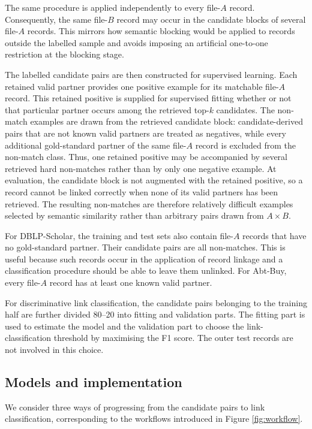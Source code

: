 The same procedure is applied independently to every file-$A$ record.
Consequently, the same file-$B$ record may occur in the candidate blocks
of several file-$A$ records. This mirrors how semantic blocking would be
applied to records outside the labelled sample and avoids imposing an
artificial one-to-one restriction at the blocking stage.

The labelled candidate pairs are then constructed for supervised learning. Each retained
valid partner provides one positive example for its matchable file-$A$ record. This retained
positive is supplied for supervised fitting whether or not that particular partner occurs
among the retrieved top-$k$ candidates. The non-match examples are drawn from the
retrieved candidate block: candidate-derived pairs that are not known valid partners are
treated as negatives, while every additional gold-standard partner of the same file-$A$
record is excluded from the non-match class. Thus, one retained positive may be accompanied
by several retrieved hard non-matches rather than by only one negative example. At
evaluation, the candidate block is not augmented with the retained positive, so a record
cannot be linked correctly when none of its valid partners has been retrieved. The resulting
non-matches are therefore relatively difficult examples selected by semantic similarity
rather than arbitrary pairs drawn from $A\times B$.

For DBLP-Scholar, the training and test sets also contain file-$A$ records
that have no gold-standard partner. Their candidate pairs are all
non-matches. This is useful because such records occur in the application
of record linkage and a classification procedure should be able to leave
them unlinked. For Abt-Buy, every file-$A$ record has at least one known
valid partner.

For discriminative link classification, the candidate pairs belonging to
the training half are further divided 80--20 into fitting and validation
parts. The fitting part is used to estimate the model and the validation
part to choose the link-classification threshold by maximising the F1
score. The outer test records are not involved in this choice.


\subsection{Models and implementation}
\label{sec:models-implementation}

We consider three ways of progressing from the candidate pairs to link
classification, corresponding to the workflows introduced in Figure
\ref{fig:workflow}.

